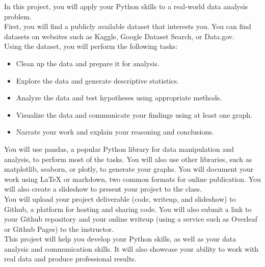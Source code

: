 \documentclass{homework}
\begin{document}
\maketitle

In this project, you will apply your Python skills to a real-world data analysis problem.\\

First, you will find a publicly available dataset that interests you. You can find datasets on websites such as Kaggle, Google Dataset Search, or Data.gov.\\

Using the dataset, you will perform the following tasks:

\begin{itemize}
    \item Clean up the data and prepare it for analysis.
    \item Explore the data and generate descriptive statistics.
    \item Analyze the data and test hypotheses using appropriate methods.
    \item Visualize the data and communicate your findings using at least one graph.
    \item Narrate your work and explain your reasoning and conclusions.
\end{itemize}

You will use pandas, a popular Python library for data manipulation and analysis, to perform most of the tasks. You will also use other libraries, such as matplotlib, seaborn, or plotly, to generate your graphs. You will document your work using LaTeX or markdown, two common formats for online publication. You will also create a slideshow to present your project to the class.\\

You will upload your project deliverable (code, writeup, and slideshow) to Github, a platform for hosting and sharing code. You will also submit a link to your Github repository and your online writeup (using a service such as Overleaf or Github Pages) to the instructor.\\

This project will help you develop your Python skills, as well as your data analysis and communication skills. It will also showcase your ability to work with real data and produce professional results.
\end{document}
